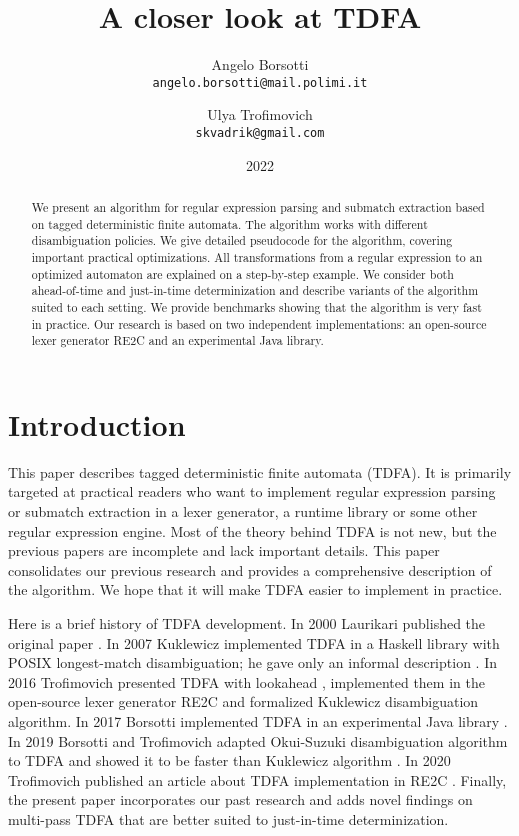 \documentclass[]{article}
\begin{document}
\title{A closer look at TDFA}
\author{
    Angelo Borsotti \\
    \texttt{\small{angelo.borsotti@mail.polimi.it}}
\and
    Ulya Trofimovich \\
    \texttt{\small{skvadrik@gmail.com}}
}
\date{2022}

\maketitle

\begin{abstract}
We present an algorithm for regular expression parsing and submatch extraction
based on tagged deterministic finite automata.
The algorithm works with different disambiguation policies.
We give detailed pseudocode for the algorithm, covering important practical optimizations.
All transformations from a regular expression to an optimized automaton are explained on a step-by-step example.
We consider both ahead-of-time and just-in-time determinization
and describe variants of the algorithm suited to each setting.
We provide benchmarks showing that the algorithm is very fast in practice.
Our research is based on two independent implementations:
an open-source lexer generator RE2C
and an experimental Java library.
\end{abstract}

\section*{Introduction}
This paper describes tagged deterministic finite automata (TDFA).
It is primarily targeted at practical readers who want to implement regular expression parsing or submatch extraction
in a lexer generator, a runtime library or some other regular expression engine.
Most of the theory behind TDFA is not new, but the previous papers are incomplete and lack important details.
This paper consolidates our previous research
and provides a comprehensive description of the algorithm.
We hope that it will make TDFA easier to implement in practice.
\medskip

%
Here is a brief history of TDFA development.
In 2000 Laurikari published the original paper \cite{Lau00}.
In 2007 Kuklewicz implemented TDFA in a Haskell library with POSIX longest-match disambiguation;
he gave only an informal description \cite{Kuk07}.
In 2016 Trofimovich presented TDFA with lookahead \cite{Tro17},
implemented them in the open-source lexer generator RE2C \cite{RE2C}
and formalized Kuklewicz disambiguation algorithm.
In 2017 Borsotti implemented TDFA in an experimental Java library \cite{RE2CJava}.
In 2019 Borsotti and Trofimovich adapted Okui-Suzuki disambiguation algorithm to TDFA
and showed it to be faster than Kuklewicz algorithm \cite{BorTro19}.
In 2020 Trofimovich published an article about TDFA implementation in RE2C \cite{Tro20}.
%
Finally, the present paper incorporates our past research
and adds novel findings on multi-pass TDFA that are better suited to just-in-time determinization.
\medskip
\end{document}
